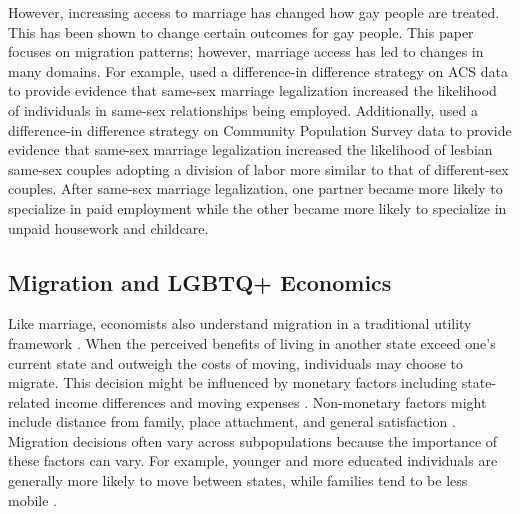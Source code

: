 \documentclass[12pt,letterpaper]{article}
\begin{document}
However, increasing access to marriage has changed how gay people are treated. This has been shown to change certain outcomes for gay people. This paper focuses on migration patterns; however, marriage access has led to changes in many domains. For example, \citet{3} used a difference-in difference strategy on ACS data to provide evidence that same-sex marriage legalization increased the likelihood of individuals in same-sex relationships being employed. Additionally, \citet{30} used a difference-in difference strategy on Community Population Survey data to provide evidence that same-sex marriage legalization increased the likelihood of lesbian same-sex couples adopting a division of labor more similar to that of different-sex couples. After same-sex marriage legalization,  one partner became more likely to specialize in paid employment while the other became more likely to specialize in unpaid housework and childcare. 


\subsection{Migration and LGBTQ+ Economics}
Like marriage, economists also understand migration in a traditional utility framework \citep{12, 8}. When the perceived benefits of living in another state exceed one’s current state and outweigh the costs of moving, individuals may choose to migrate. This decision might be influenced by monetary factors including state-related income differences and moving expenses \citep{1, 15, 16, 17}. Non-monetary factors might include distance from family, place attachment, and general satisfaction \citep{1, 15}. Migration decisions often vary across subpopulations because the importance of these factors can vary. For example, younger and more educated individuals are generally more likely to move between states, while families tend to be less mobile \citep{16, 17}. 
\end{document}
